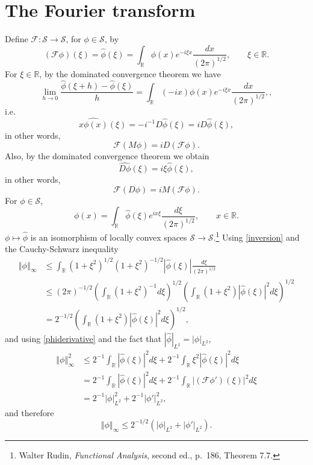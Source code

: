 \documentclass{article}
\newcommand{\norm}[1]{\left\Vert #1 \right\Vert}
\theoremstyle{definition}
\theoremstyle{definition}
\begin{document}
\section{The Fourier transform}
Define $\mathscr{F}:\mathscr{S} \to \mathscr{S}$, for $\phi \in \mathscr{S}$, by
\[
(\mathscr{F}\phi)(\xi)=\hat{\phi}(\xi)= \int_{\mathbb{R}} \phi(x) e^{-i\xi x} \frac{dx}{(2\pi)^{1/2}},
\qquad \xi \in \mathbb{R}.
\]
For $\xi \in \mathbb{R}$, by the dominated convergence theorem we have
\[
\lim_{h \to 0} \frac{\hat{\phi}(\xi+h)-\hat{\phi}(\xi)}{h} = \int_{\mathbb{R}} (-ix) \phi(x) e^{-i\xi x}  \frac{dx}{(2\pi)^{1/2}},,
\]
i.e.
\[
\widehat{x\phi(x)}(\xi) =-i^{-1} D \hat{\phi}(\xi) = iD \hat{\phi}(\xi),
\]
in other words,
\begin{equation}
\mathscr{F}(M\phi) = iD(\mathscr{F}\phi).
\label{xphi}
\end{equation}
Also, by the dominated convergence theorem we obtain
\[
\widehat{D \phi}(\xi) = i\xi \hat{\phi}(\xi),
\]
in other words,
\begin{equation}
\mathscr{F}(D\phi) = iM(\mathscr{F}\phi).
\label{phiderivative}
\end{equation}
For $\phi \in \mathscr{S}$,
\begin{equation}
\phi(x) = \int_{\mathbb{R}} \hat{\phi}(\xi) e^{ix \xi} \frac{d\xi}{(2\pi)^{1/2}},\qquad
x \in \mathbb{R}.
\label{inversion}
\end{equation}
$\phi \mapsto \hat{\phi}$ is an isomorphism of locally convex spaces
$\mathscr{S} \to \mathscr{S}$.\footnote{Walter Rudin, {\em Functional Analysis}, second ed.,
p.~186, Theorem 7.7.}
Using \eqref{inversion} and the Cauchy-Schwarz inequality
\begin{align*}
\norm{\phi}_\infty& \leq \int_{\mathbb{R}} (1+\xi^2)^{1/2} (1+\xi^2)^{-1/2} |\hat{\phi}(\xi)| \frac{d\xi}{(2\pi)^{1/2}}\\
&\leq (2\pi)^{-1/2} \left(\int_{\mathbb{R}} (1+\xi^2)^{-1} d\xi\right)^{1/2} 
\left( \int_{\mathbb{R}} (1+\xi^2) |\hat{\phi}(\xi)|^2 d\xi \right)^{1/2}\\
&=2^{-1/2} \left( \int_{\mathbb{R}} (1+\xi^2) |\hat{\phi}(\xi)|^2 d\xi \right)^{1/2},
\end{align*}
and using  \eqref{phiderivative} and the fact that $|\hat{\phi}|_{L^2}=|\phi|_{L^2}$,
\begin{align*}
\norm{\phi}_\infty^2&\leq 2^{-1}  \int_{\mathbb{R}}  |\hat{\phi}(\xi)|^2 d\xi
+ 2^{-1} \int_{\mathbb{R}} \xi^2 |\hat{\phi}(\xi)|^2 d\xi\\
&=2^{-1}  \int_{\mathbb{R}}  |\hat{\phi}(\xi)|^2 d\xi
+2^{-1} \int_{\mathbb{R}} |(\mathscr{F}\phi')(\xi)|^2 d\xi\\
&=2^{-1} |\phi|_{L^2}^2 + 2^{-1} |\phi'|_{L^2}^2,
\end{align*}
and therefore
\begin{equation}
\norm{\phi}_{\infty} \leq 2^{-1/2}(|\phi|_{L^2} + |\phi'|_{L^2}).
\label{supremum}
\end{equation}
\end{document}
